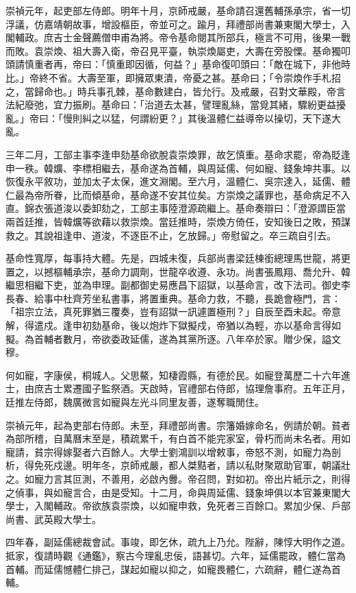 \begin{pinyinscope}
崇禎元年，起吏部左侍郎。明年十月，京師戒嚴，基命請召還舊輔孫承宗，省一切浮議，仿嘉靖朝故事，增設樞臣，帝並可之。踰月，拜禮部尚書兼東閣大學士，入閣輔政。庶吉士金聲薦僧申甫為將。帝令基命閱其所部兵，極言不可用，後果一戰而敗。袁崇煥、祖大壽入衛，帝召見平臺，執崇煥屬吏，大壽在旁股慄。基命獨叩頭請慎重者再，帝曰：「慎重即因循，何益？」基命復叩頭曰：「敵在城下，非他時比。」帝終不省。大壽至軍，即擁眾東潰，帝憂之甚。基命曰；「令崇煥作手札招之，當歸命也。」時兵事孔棘，基命數建白，皆允行。及戒嚴，召對文華殿，帝言法紀廢弛，宜力振刷。基命曰：「治道去太甚，譬理亂絲，當覓其緒，驟紛更益擾亂。」帝曰：「慢則糾之以猛，何謂紛更？」其後溫體仁益導帝以操切，天下遂大亂。

三年二月，工部主事李逢申劾基命欲脫袁崇煥罪，故乞慎重。基命求罷，帝為貶逢申一秩。韓爌、李標相繼去，基命遂為首輔，與周延儒、何如寵、錢象坤共事。以恢復永平敘功，並加太子太保，進文淵閣。至六月，溫體仁、吳宗達入，延儒、體仁最為帝所眷，比而傾基命，基命遂不安其位矣。方崇煥之議罪也，基命病足不入直。錦衣張道浚以委卸劾之，工部主事陸澄源疏繼上。基命奏辯曰：「澄源謂臣當兩首廷推，皆韓爌等欲藉以救崇煥。當廷推時，崇煥方倚任，安知後日之敗，預謀救之。其說祖逢申、道浚，不逐臣不止，乞放歸。」帝慰留之。卒三疏自引去。

基命性寬厚，每事持大體。先是，四城未復，兵部尚書梁廷棟銜總理馬世龍，將更置之，以撼樞輔承宗，基命力調劑，世龍卒收遵、永功。尚書張鳳翔、喬允升、韓繼思相繼下吏，並為申理。副都御史易應昌下詔獄，以基命言，改下法司。御史李長春、給事中杜齊芳坐私書事，將置重典。基命力救，不聽，長跪會極門，言：「祖宗立法，真死罪猶三覆奏，豈有詔獄一訊遽置極刑？」自辰至酉未起。帝意解，得遣戍。逢申初劾基命，後以炮炸下獄擬戍，帝猶以為輕，亦以基命言得如擬。為首輔者數月，帝欲委政延儒，遂為其黨所逐。八年卒於家。贈少保，謚文穆。

何如寵，字康侯，桐城人。父思鰲，知棲霞縣，有德於民。如寵登萬歷二十六年進士，由庶吉士累遷國子監祭酒。天啟時，官禮部右侍郎，協理詹事府。五年正月，廷推左侍郎，魏廣微言如寵與左光斗同里友善，遂奪職閒住。

崇禎元年，起為吏部右侍郎。未至，拜禮部尚書。宗籓婚嫁命名，例請於朝。貧者為部所稽，自萬曆末至是，積疏累千，有白首不能完家室，骨朽而尚未名者。用如寵請，貧宗得嫁娶者六百餘人。大學士劉鴻訓以增敕事，帝怒不測，如寵力為剖析，得免死戍邊。明年冬，京師戒嚴，都人桀黠者，請以私財聚眾助官軍，朝議壯之。如寵力言其叵測，不善用，必啟內釁。帝召問，對如初。帝出片紙示之，則得之偵事，與如寵言合，由是受知。十二月，命與周延儒、錢象坤俱以本官兼東閣大學士，入閣輔政。帝欲族袁崇煥，以如寵申救，免死者三百餘口。累加少保、戶部尚書、武英殿大學士。

四年春，副延儒總裁會試。事竣，即乞休，疏九上乃允。陛辭，陳惇大明作之道。抵家，復請時觀《通鑑》，察古今理亂忠佞，語甚切。六年，延儒罷政，體仁當為首輔。而延儒憾體仁排己，謀起如寵以抑之，如寵畏體仁，六疏辭，體仁遂為首輔。


\end{pinyinscope}
